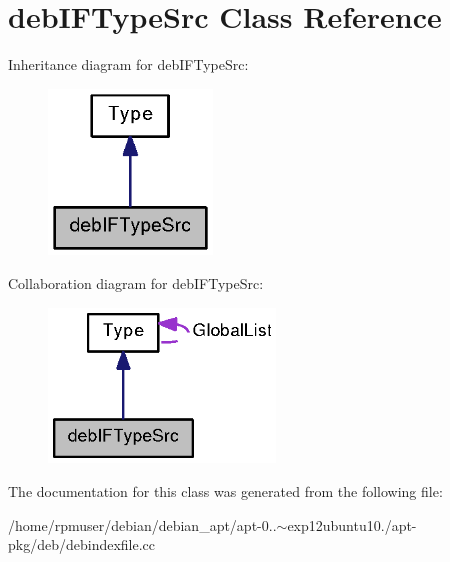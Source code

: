 \section{deb\-I\-F\-Type\-Src \-Class \-Reference}
\label{classdebIFTypeSrc}


\-Inheritance diagram for deb\-I\-F\-Type\-Src\-:
\nopagebreak
\begin{figure}[H]
\begin{center}
\leavevmode
\includegraphics[width=124pt]{classdebIFTypeSrc__inherit__graph}
\end{center}
\end{figure}


\-Collaboration diagram for deb\-I\-F\-Type\-Src\-:
\nopagebreak
\begin{figure}[H]
\begin{center}
\leavevmode
\includegraphics[width=171pt]{classdebIFTypeSrc__coll__graph}
\end{center}
\end{figure}


\-The documentation for this class was generated from the following file\-:\begin{DoxyCompactItemize}
\item 
/home/rpmuser/debian/debian\-\_\-apt/apt-\/0..$\sim$exp12ubuntu10./apt-\/pkg/deb/debindexfile.\-cc\end{DoxyCompactItemize}
